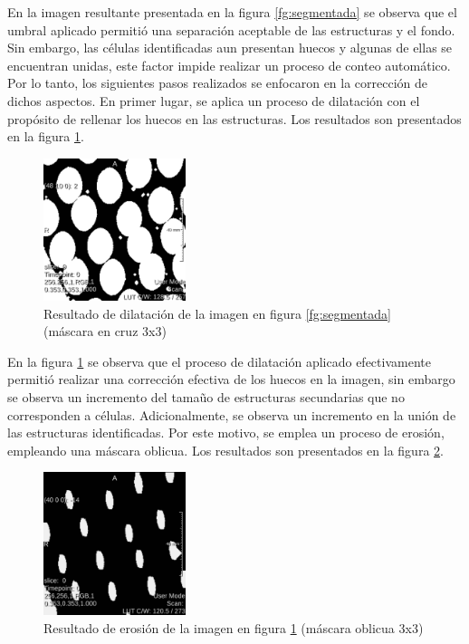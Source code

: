 \documentclass{article}
\begin{document}
En la imagen resultante presentada en la figura \ref{fg:segmentada} se observa que el umbral aplicado permiti\'{o} una separaci\'{o}n aceptable de las estructuras y el fondo. Sin embargo, las c\'{e}lulas identificadas aun presentan huecos y algunas de ellas se encuentran unidas, este factor impide realizar un proceso de conteo autom\'{a}tico. Por lo tanto, los siguientes pasos realizados se enfocaron en la correcci\'{o}n de dichos aspectos. En primer lugar, se aplica un proceso de dilataci\'{o}n con el prop\'{o}sito de rellenar los huecos en las estructuras. Los resultados son presentados en la figura \ref{fg:dilatacion}.

\begin{figure}[ht]
\begin{center}
\includegraphics[width=0.37\textwidth]{1Etiquetado/1_img3} %
\caption{Resultado de dilataci\'{o}n de la imagen en figura \ref{fg:segmentada} (m\'{a}scara en cruz 3x3)}
\label{fg:dilatacion}
\end{center}
\end{figure}
\FloatBarrier

En la figura \ref{fg:dilatacion} se observa que el proceso de dilataci\'{o}n aplicado efectivamente permiti\'{o} realizar una correcci\'{o}n efectiva de los huecos en la imagen, sin embargo se observa un incremento del tama\~{u}o de estructuras secundarias que no corresponden a c\'{e}lulas. Adicionalmente, se observa un incremento en la uni\'{o}n de las estructuras identificadas. Por este motivo, se emplea un proceso de erosi\'{o}n, empleando una m\'{a}scara oblicua. Los resultados son presentados en la figura \ref{fg:erosion}.

\begin{figure}[ht]
\begin{center}
\includegraphics[width=0.37\textwidth]{1Etiquetado/1_img4} %
\caption{Resultado de erosi\'{o}n de la imagen en figura \ref{fg:dilatacion} (m\'{a}scara oblicua 3x3)}
\label{fg:erosion}
\end{center}
\end{figure}
\FloatBarrier
\end{document}
